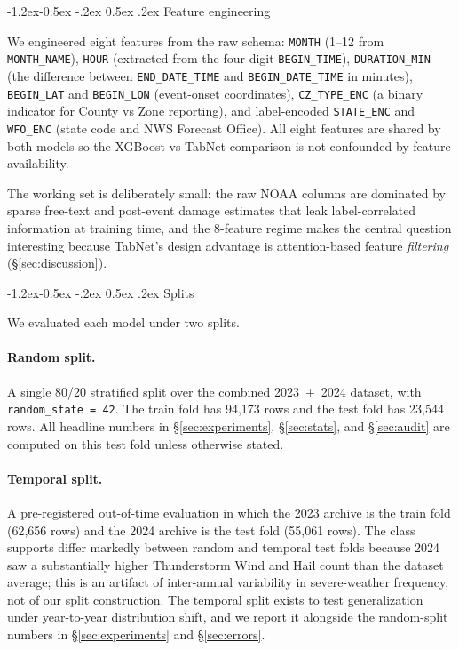 \documentclass[11pt]{article}
\makeatletter
\renewcommand\subsection{\@startsection{subsection}{2}{\z@}%
  {-1.2ex\@plus -0.5ex \@minus -.2ex}%
  {0.5ex \@plus .2ex}%
  {\normalfont\normalsize\bfseries}}
\makeatother
\begin{document}
\subsection{Feature engineering}

We engineered eight features from the raw schema: \texttt{MONTH}
(1--12 from \texttt{MONTH\_NAME}), \texttt{HOUR} (extracted from the
four-digit \texttt{BEGIN\_TIME}), \texttt{DURATION\_MIN} (the
difference between \texttt{END\_DATE\_TIME} and
\texttt{BEGIN\_DATE\_TIME} in minutes), \texttt{BEGIN\_LAT} and
\texttt{BEGIN\_LON} (event-onset coordinates), \texttt{CZ\_TYPE\_ENC}
(a binary indicator for County vs Zone reporting), and label-encoded
\texttt{STATE\_ENC} and \texttt{WFO\_ENC} (state code and NWS
Forecast Office). All eight features are shared by both models so
the XGBoost-vs-TabNet comparison is not confounded by feature
availability.

The working set is deliberately small: the raw NOAA columns are
dominated by sparse free-text and post-event damage estimates that
leak label-correlated information at training time, and the 8-feature
regime makes the central question interesting because TabNet's
design advantage is attention-based feature \emph{filtering}
(\S\ref{sec:discussion}).

\subsection{Splits}

We evaluated each model under two splits.

\paragraph{Random split.} A single 80/20 stratified split over the
combined 2023~+~2024 dataset, with \texttt{random\_state = 42}. The
train fold has 94{,}173 rows and the test fold has 23{,}544 rows.
All headline numbers in \S\ref{sec:experiments}, \S\ref{sec:stats},
and \S\ref{sec:audit} are computed on this test fold unless
otherwise stated.

\paragraph{Temporal split.} A pre-registered out-of-time evaluation
in which the 2023 archive is the train fold (62{,}656 rows) and the
2024 archive is the test fold (55{,}061 rows). The class supports
differ markedly between random and temporal test folds because 2024
saw a substantially higher Thunderstorm Wind and Hail count than the
dataset average; this is an artifact of inter-annual variability in
severe-weather frequency, not of our split construction. The
temporal split exists to test generalization under year-to-year
distribution shift, and we report it alongside the random-split
numbers in \S\ref{sec:experiments} and \S\ref{sec:errors}.
\end{document}
